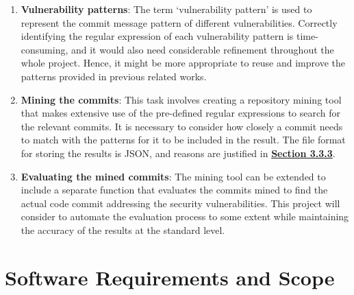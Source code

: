 \documentclass[12pt, a4paper]{report}
\begin{document}
\begin{enumerate}
	\item \textbf{Vulnerability patterns}: The term `vulnerability pattern' is used to represent the
  commit message pattern of different vulnerabilities. Correctly identifying the regular expression
  of each vulnerability pattern is time-consuming, and it would also need considerable refinement
  throughout the whole project. Hence, it might be more appropriate to reuse and improve the
  patterns provided in previous related works.
	\item \textbf{Mining the commits}: This task involves creating a repository mining tool that makes
	extensive use of the pre-defined regular expressions to search for the relevant commits. It is
	necessary to consider how closely a commit needs to match with the patterns for it to be included
	in the result. The file format for storing the results is JSON, and reasons are justified in
	\hyperref[subsec:file_format]{\textbf{Section 3.3.3}}.
	\item \textbf{Evaluating the mined commits}: The mining tool can be extended to include a separate
	function that evaluates the commits mined to find the actual code commit addressing the security
	vulnerabilities. This project will consider to automate the evaluation process to some extent
	while maintaining the accuracy of the results at the standard level.
\end{enumerate}

\section{Software Requirements and Scope}
\end{document}
